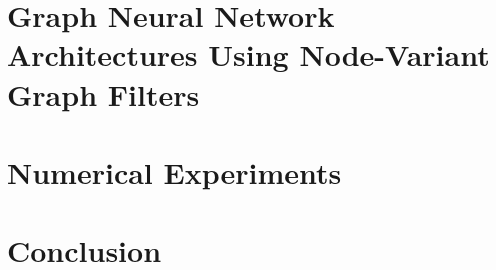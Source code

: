 \documentclass{article}
\begin{document}



\section{Graph Neural Network Architectures Using Node-Variant Graph Filters}
\label{sec:archit}




\section{Numerical Experiments} \label{sec:sims}




\section{Conclusion} \label{sec:conclusions}





\end{document}

